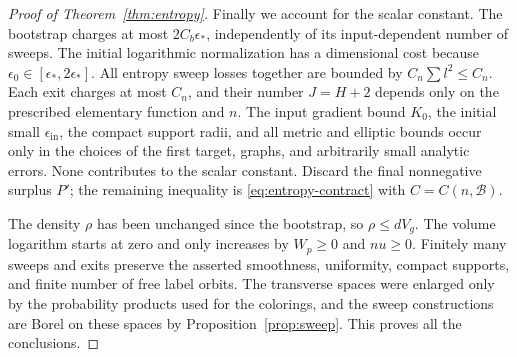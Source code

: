 \begin{proof}[Proof of Theorem~\ref{thm:entropy}]
Finally we account for the scalar constant.  The bootstrap charges
at most \(2C_b\epsilon_*\), independently of its input-dependent
number of sweeps.  The initial logarithmic normalization has a
dimensional cost because \(\epsilon_0\in[\epsilon_*,2\epsilon_*]\).
All entropy sweep losses together are bounded by
\(C_n\sum l^2\leq C_n\).  Each exit charges at most \(C_n\), and their
number \(J=H+2\) depends only on the prescribed elementary function
and \(n\).  The input gradient bound \(K_0\), the initial small
\(\epsilon_{\mathrm{in}}\), the compact support radii, and all metric
and elliptic bounds occur only in the choices of the first target,
graphs, and arbitrarily small analytic errors.  None contributes to
the scalar constant.  Discard the final nonnegative surplus \(P'\);
the remaining inequality is \eqref{eq:entropy-contract} with
\(C=C(n,\mathcal B)\).

The density \(\rho\) has been unchanged since the bootstrap, so
\(\rho\leq dV_g\).  The volume logarithm starts at zero and only
increases by \(W_p\geq0\) and \(nu\geq0\).  Finitely many sweeps and
exits preserve the asserted smoothness, uniformity, compact supports,
and finite number of free label orbits.  The transverse spaces were
enlarged only by the probability products used for the colorings,
and the sweep constructions are Borel on these spaces by
Proposition~\ref{prop:sweep}.  This proves all the conclusions.
\end{proof}
